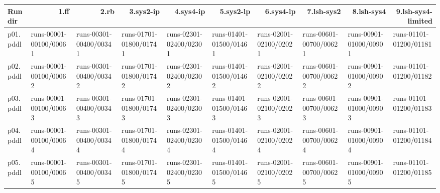 \documentclass{article}
\begin{document}
\begin{tabular}{@{}lrrrrrrrrr@{}}
Run dir & 1.ff & 2.rb & 3.sys2-ip & 4.sys4-ip & 5.sys2-lp & 6.sys4-lp & 7.lsh-sys2 & 8.lsh-sys4 & 9.lsh-sys4-limited \\
\midrule
p01.pddl & \multicolumn{1}{|l|}{runs-00001-00100/00061} & \multicolumn{1}{|l|}{runs-00301-00400/00341} & \multicolumn{1}{|l|}{runs-01701-01800/01741} & \multicolumn{1}{|l|}{runs-02301-02400/02301} & \multicolumn{1}{|l|}{runs-01401-01500/01461} & \multicolumn{1}{|l|}{runs-02001-02100/02021} & \multicolumn{1}{|l|}{runs-00601-00700/00621} & \multicolumn{1}{|l|}{runs-00901-01000/00901} & \multicolumn{1}{|l|}{runs-01101-01200/01181} \\
p02.pddl & \multicolumn{1}{|l|}{runs-00001-00100/00062} & \multicolumn{1}{|l|}{runs-00301-00400/00342} & \multicolumn{1}{|l|}{runs-01701-01800/01742} & \multicolumn{1}{|l|}{runs-02301-02400/02302} & \multicolumn{1}{|l|}{runs-01401-01500/01462} & \multicolumn{1}{|l|}{runs-02001-02100/02022} & \multicolumn{1}{|l|}{runs-00601-00700/00622} & \multicolumn{1}{|l|}{runs-00901-01000/00902} & \multicolumn{1}{|l|}{runs-01101-01200/01182} \\
p03.pddl & \multicolumn{1}{|l|}{runs-00001-00100/00063} & \multicolumn{1}{|l|}{runs-00301-00400/00343} & \multicolumn{1}{|l|}{runs-01701-01800/01743} & \multicolumn{1}{|l|}{runs-02301-02400/02303} & \multicolumn{1}{|l|}{runs-01401-01500/01463} & \multicolumn{1}{|l|}{runs-02001-02100/02023} & \multicolumn{1}{|l|}{runs-00601-00700/00623} & \multicolumn{1}{|l|}{runs-00901-01000/00903} & \multicolumn{1}{|l|}{runs-01101-01200/01183} \\
p04.pddl & \multicolumn{1}{|l|}{runs-00001-00100/00064} & \multicolumn{1}{|l|}{runs-00301-00400/00344} & \multicolumn{1}{|l|}{runs-01701-01800/01744} & \multicolumn{1}{|l|}{runs-02301-02400/02304} & \multicolumn{1}{|l|}{runs-01401-01500/01464} & \multicolumn{1}{|l|}{runs-02001-02100/02024} & \multicolumn{1}{|l|}{runs-00601-00700/00624} & \multicolumn{1}{|l|}{runs-00901-01000/00904} & \multicolumn{1}{|l|}{runs-01101-01200/01184} \\
p05.pddl & \multicolumn{1}{|l|}{runs-00001-00100/00065} & \multicolumn{1}{|l|}{runs-00301-00400/00345} & \multicolumn{1}{|l|}{runs-01701-01800/01745} & \multicolumn{1}{|l|}{runs-02301-02400/02305} & \multicolumn{1}{|l|}{runs-01401-01500/01465} & \multicolumn{1}{|l|}{runs-02001-02100/02025} & \multicolumn{1}{|l|}{runs-00601-00700/00625} & \multicolumn{1}{|l|}{runs-00901-01000/00905} & \multicolumn{1}{|l|}{runs-01101-01200/01185} \\

\end{tabular}
\end{document}
